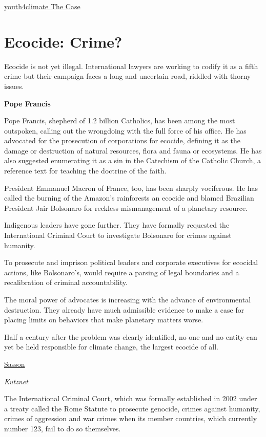 \documentclass[
]{book}
\begin{document}
\href{https://youth4climatejustice.org/the-case/}{youth4climate The Case}

\hypertarget{ecocide-crime}{%
\section{Ecocide: Crime?}\label{ecocide-crime}}

Ecocide is not yet illegal. International lawyers are working to
codify it as a fifth crime but their campaign faces a long and uncertain road,
riddled with thorny issues.

\textbf{Pope Francis}

Pope Francis, shepherd of 1.2 billion Catholics, has been among the most outspoken,
calling out the wrongdoing with the full force of his office.
He has advocated for the prosecution of corporations for ecocide,
defining it as the damage or destruction of natural resources, flora and fauna or ecosystems.
He has also suggested enumerating it as a sin in the Catechism of the Catholic Church,
a reference text for teaching the doctrine of the faith.

President Emmanuel Macron of France, too, has been sharply vociferous.
He has called the burning of the Amazon's rainforests an ecocide and
blamed Brazilian President Jair Bolsonaro for
reckless mismanagement of a planetary resource.

Indigenous leaders have gone further.
They have formally requested the International Criminal Court to investigate Bolsonaro
for crimes against humanity.

To prosecute and imprison political leaders and corporate executives for ecocidal actions,
like Bolsonaro's, would require a parsing of legal boundaries and
a recalibration of criminal accountability.

The moral power of advocates is increasing with the advance of environmental destruction.
They already have much admissible evidence to make a case for
placing limits on behaviors that make planetary matters worse.

Half a century after the problem was clearly identified,
no one and no entity can yet be held responsible for climate change,
the largest ecocide of all.

\href{https://insideclimatenews.org/news/07042021/ecocide-should-destruction-of-the-planet-be-a-crime/}{Sasson}

\emph{Kutznet}

The International Criminal Court, which was formally established in 2002 under a treaty called the Rome Statute to prosecute genocide, crimes against humanity, crimes of aggression and war crimes when its member countries, which currently number 123, fail to do so themselves.
\end{document}
